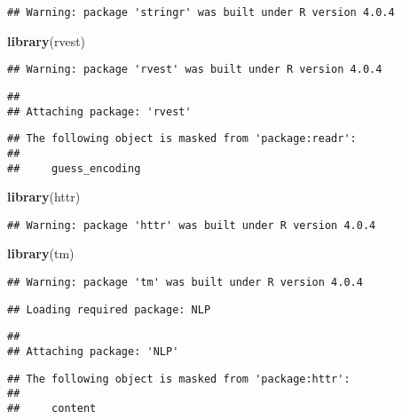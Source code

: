 \documentclass[
]{article}
\newenvironment{Shaded}{\begin{snugshade}}{\end{snugshade}}
\newcommand{\KeywordTok}[1]{\textcolor[rgb]{0.13,0.29,0.53}{\textbf{#1}}}
\newcommand{\NormalTok}[1]{#1}
\begin{document}
\begin{verbatim}
## Warning: package 'stringr' was built under R version 4.0.4
\end{verbatim}

\begin{Shaded}
\begin{Highlighting}[]
\KeywordTok{library}\NormalTok{(rvest)}
\end{Highlighting}
\end{Shaded}

\begin{verbatim}
## Warning: package 'rvest' was built under R version 4.0.4
\end{verbatim}

\begin{verbatim}
## 
## Attaching package: 'rvest'
\end{verbatim}

\begin{verbatim}
## The following object is masked from 'package:readr':
## 
##     guess_encoding
\end{verbatim}

\begin{Shaded}
\begin{Highlighting}[]
\KeywordTok{library}\NormalTok{(httr)}
\end{Highlighting}
\end{Shaded}

\begin{verbatim}
## Warning: package 'httr' was built under R version 4.0.4
\end{verbatim}

\begin{Shaded}
\begin{Highlighting}[]
\KeywordTok{library}\NormalTok{(tm)}
\end{Highlighting}
\end{Shaded}

\begin{verbatim}
## Warning: package 'tm' was built under R version 4.0.4
\end{verbatim}

\begin{verbatim}
## Loading required package: NLP
\end{verbatim}

\begin{verbatim}
## 
## Attaching package: 'NLP'
\end{verbatim}

\begin{verbatim}
## The following object is masked from 'package:httr':
## 
##     content
\end{verbatim}
\end{document}
